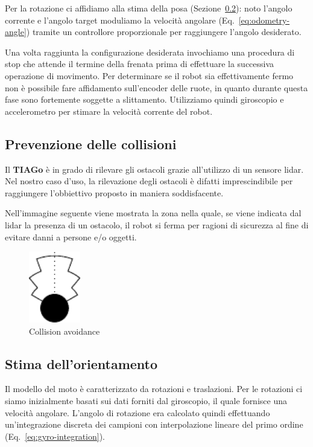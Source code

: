 \documentclass[a4paper]{article}
\begin{document}
	Per la rotazione ci affidiamo alla stima della posa
	(Sezione~\ref{subsec:Orientamento}): noto l'angolo corrente e l'angolo
	target moduliamo la velocità angolare (Eq.~\ref{eq:odometry-angle}) tramite
	un controllore proporzionale per raggiungere l'angolo desiderato.

	Una volta raggiunta la configurazione desiderata invochiamo una procedura
	di stop che attende il termine della frenata prima di effettuare la
	successiva operazione di movimento. Per determinare se il robot sia
	effettivamente fermo non è possibile fare affidamento sull'encoder delle
	ruote, in quanto durante questa fase sono fortemente soggette a
	slittamento. Utilizziamo quindi giroscopio e accelerometro per stimare la
	velocità corrente del robot.

	\subsection{Prevenzione delle collisioni}\label{subsec:Rilevamento-delle-collisioni} 
	Il \textbf{TIAGo} è in grado di rilevare gli ostacoli grazie all'utilizzo
	di un sensore lidar. Nel nostro caso d'uso, la rilevazione degli ostacoli è
	difatti imprescindibile per raggiungere l'obbiettivo proposto in maniera
	soddisfacente. 
	
	Nell'immagine seguente viene mostrata la zona nella quale, se viene
	indicata dal lidar la presenza di un ostacolo, il robot si ferma
	per ragioni di sicurezza al fine di evitare danni a persone e/o oggetti.
	\begin{figure}[H]
		\centering
		\includegraphics[width=0.2\textwidth]{./img/collision_avoidance.pdf}
		\caption{Collision avoidance}
		\label{fig:collision_avoidance}
	\end{figure}
	
	

	\subsection{Stima dell'orientamento}\label{subsec:Orientamento}
	Il modello del moto è caratterizzato da rotazioni e traslazioni. Per le
	rotazioni ci siamo inizialmente basati sui dati forniti dal giroscopio, il
	quale fornisce una velocità angolare. L'angolo di rotazione era calcolato
	quindi effettuando un'integrazione discreta dei campioni con interpolazione
	lineare del primo ordine (Eq.~\ref{eq:gyro-integration}).  
\end{document}

